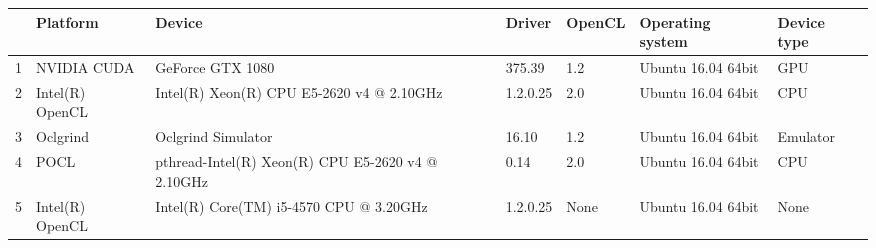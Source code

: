 \begin{tabular}{lllllll}
\toprule
{} &         Platform &                                             Device &    Driver & OpenCL &    Operating system & Device type \\
\midrule
1 &      NVIDIA CUDA &                                   GeForce GTX 1080 &    375.39 &    1.2 &  Ubuntu 16.04 64bit &         GPU \\
2 &  Intel(R) OpenCL &          Intel(R) Xeon(R) CPU E5-2620 v4 @ 2.10GHz &  1.2.0.25 &    2.0 &  Ubuntu 16.04 64bit &         CPU \\
3 &         Oclgrind &                                 Oclgrind Simulator &     16.10 &    1.2 &  Ubuntu 16.04 64bit &    Emulator \\
4 &             POCL &  pthread-Intel(R) Xeon(R) CPU E5-2620 v4 @ 2.10GHz &      0.14 &    2.0 &  Ubuntu 16.04 64bit &         CPU \\
5 &  Intel(R) OpenCL &            Intel(R) Core(TM) i5-4570 CPU @ 3.20GHz &  1.2.0.25 &   None &  Ubuntu 16.04 64bit &        None \\
\bottomrule
\end{tabular}
